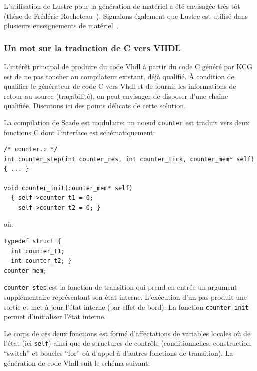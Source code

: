 \documentclass[a4paper]{article}
\newcommand{\lustre}{{\sc Lustre}}
\newcommand{\scade}{{\sc Scade}}
\newcommand{\vhdl}{{\sc Vhdl}}
\begin{document}
L'utilisation de Lustre pour la génération de matériel a été envisagée
très tôt (thèse de Frédéric Rocheteau~\cite{lustre:rocheteau91}). Signalons
également que \lustre{} est utilisé dans plusieurs enseignements de
matériel~\cite{lustre:amblard05}.

\subsubsection{Un mot sur la traduction de C vers VHDL}
L'intérêt principal de produire du code \vhdl{} à partir du code C généré par KCG est
de ne pas toucher au compilateur existant, déjà qualifié. À condition
de qualifier le générateur de code C vers \vhdl{} et de fournir les
informations de retour au source (tra\c{c}abilité), on peut envisager de disposer 
d'une chaîne qualifiée. Discutons ici des points délicats de cette solution.

La compilation de \scade{} est modulaire: un noeud \texttt{counter}
est traduit vers deux fonctions
C dont l'interface est schématiquement:

\begin{verbatim}
/* counter.c */
int counter_step(int counter_res, int counter_tick, counter_mem* self) { ... }

void counter_init(counter_mem* self)
  { self->counter_t1 = 0;
    self->counter_t2 = 0; }
\end{verbatim}
où:
\begin{verbatim}
typedef struct { 
  int counter_t1; 
  int counter_t2; }
counter_mem;
\end{verbatim}
\texttt{counter\_step} est la fonction de transition qui prend
en entrée un argument supplémentaire représentant son état interne. L'exécution
d'un pas produit une sortie et met à jour l'état interne (par effet de bord).
La fonction \texttt{counter\_init} permet d'initialiser l'état interne.

Le corps de ces deux fonctions est formé d'affectations de variables
locales où de l'état (ici \texttt{self}) ainsi que de structures de
contrôle (conditionnelles, construction ``switch'' et boucles ``for''
où d'appel à d'autres fonctions de transition). La génération de code
\vhdl{} suit le schéma suivant:
\end{document}

